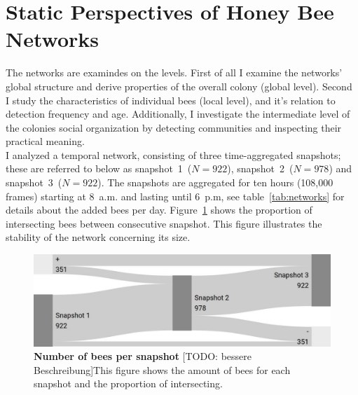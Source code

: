 \section{Static Perspectives of Honey Bee Networks}
The networks are examindes on the levels.
First of all I examine the networks' global structure and derive properties of the overall colony (global level). Second I study the characteristics of individual bees (local level), and it's relation to detection frequency and age.
Additionally, I investigate the intermediate level of the colonies social organization by detecting communities and inspecting their practical meaning.\\

I analyzed a temporal network, consisting of three time-aggregated snapshots; these are referred to below as snapshot~1~($N=922$), snapshot~2~($N=978$) and snapshot~3~($N=922$). 
The snapshots are aggregated for ten hours (108,000 frames) starting at 8~a.m. and lasting until 6~p.m, see table~\ref{tab:networks} for details about the added bees per day. Figure~\ref{fig:network-matching} shows the proportion of intersecting bees between consecutive snapshot. This figure illustrates the stability of the network concerning its size. 



\begin{figure}[htb]
	\centering
	\includegraphics[width=1.0\textwidth]{Figures/network_matching}
	\caption[Number of bees per snapshot]{\textbf{Number of bees per snapshot} [TODO: bessere Beschreibung]This figure shows the amount of bees for each snapshot and the proportion of intersecting.}
	\label{fig:network-matching}
\end{figure}





